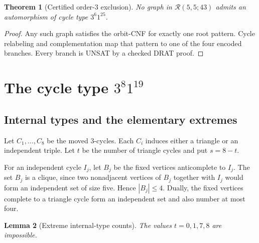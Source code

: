 \documentclass[11pt]{article}
\newtheorem{theorem}{Theorem}
\newtheorem{lemma}[theorem]{Lemma}
\newcommand{\Rcal}{\mathcal{R}}
\begin{document}
\begin{theorem}[Certified order-3 exclusion]
\label{thm:c6}
No graph in $\Rcal(5,5;43)$ admits an automorphism of cycle type
$3^6 1^{25}$.
\end{theorem}

\begin{proof}
Any such graph satisfies the orbit-CNF for exactly one root pattern. Cycle
relabeling and complementation map that pattern to one of the four encoded
branches. Every branch is UNSAT by a checked DRAT proof.
\end{proof}

\section{\texorpdfstring{The cycle type $3^8 1^{19}$}
{The cycle type 3\string^8 1\string^19}}

\subsection{Internal types and the elementary extremes}

Let $C_1,\ldots,C_8$ be the moved 3-cycles. Each $C_i$ induces either a
triangle or an independent triple. Let $t$ be the number of triangle cycles
and put $s=8-t$.

For an independent cycle $I_j$, let $B_j$ be the fixed vertices
anticomplete to $I_j$. The set $B_j$ is a clique, since two nonadjacent
vertices of $B_j$ together with $I_j$ would form an independent set of size
five. Hence $|B_j|\le4$. Dually, the fixed vertices complete to a triangle
cycle form an independent set and also number at most four.

\begin{lemma}[Extreme internal-type counts]
\label{lem:c8-extremes}
The values $t=0,1,7,8$ are impossible.
\end{lemma}
\end{document}
